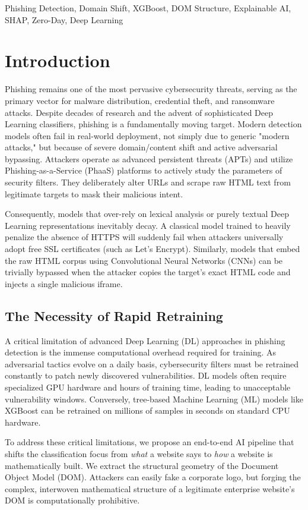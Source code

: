 \documentclass[conference]{IEEEtran}
\begin{document}
\begin{IEEEkeywords}
Phishing Detection, Domain Shift, XGBoost, DOM Structure, Explainable AI, SHAP, Zero-Day, Deep Learning
\end{IEEEkeywords}

\section{Introduction}
Phishing remains one of the most pervasive cybersecurity threats, serving as the primary vector for malware distribution, credential theft, and ransomware attacks. Despite decades of research and the advent of sophisticated Deep Learning classifiers, phishing is a fundamentally moving target. Modern detection models often fail in real-world deployment, not simply due to generic "modern attacks," but because of severe domain/content shift and active adversarial bypassing. Attackers operate as advanced persistent threats (APTs) and utilize Phishing-as-a-Service (PhaaS) platforms to actively study the parameters of security filters. They deliberately alter URLs and scrape raw HTML text from legitimate targets to mask their malicious intent.

Consequently, models that over-rely on lexical analysis or purely textual Deep Learning representations inevitably decay. A classical model trained to heavily penalize the absence of HTTPS will suddenly fail when attackers universally adopt free SSL certificates (such as Let's Encrypt). Similarly, models that embed the raw HTML corpus using Convolutional Neural Networks (CNNs) can be trivially bypassed when the attacker copies the target's exact HTML code and injects a single malicious iframe.

\subsection{The Necessity of Rapid Retraining}
A critical limitation of advanced Deep Learning (DL) approaches in phishing detection is the immense computational overhead required for training. As adversarial tactics evolve on a daily basis, cybersecurity filters must be retrained constantly to patch newly discovered vulnerabilities. DL models often require specialized GPU hardware and hours of training time, leading to unacceptable vulnerability windows. Conversely, tree-based Machine Learning (ML) models like XGBoost can be retrained on millions of samples in seconds on standard CPU hardware.

To address these critical limitations, we propose an end-to-end AI pipeline that shifts the classification focus from \textit{what} a website says to \textit{how} a website is mathematically built. We extract the structural geometry of the Document Object Model (DOM). Attackers can easily fake a corporate logo, but forging the complex, interwoven mathematical structure of a legitimate enterprise website's DOM is computationally prohibitive. 
\end{document}
